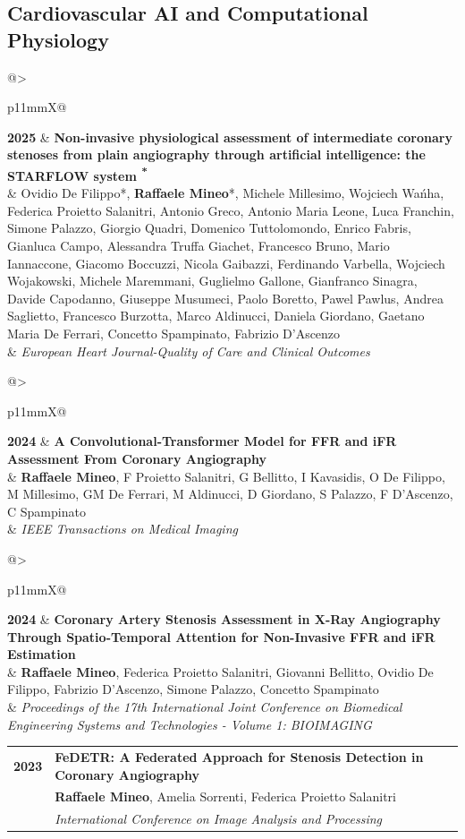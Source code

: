 \documentclass[10pt,a4paper]{article}
\makeatletter
\newcommand{\cvpub}[4]{%
\begin{tabularx}{\linewidth}{@{}>{\raggedright\arraybackslash}p{11mm}X@{}}
\textcolor{GoldAccent}{\textbf{#1}} &
\textbf{#2}\\[-1pt]
& \small #3\\[-1pt]
& \small\textit{#4}
\end{tabularx}\vspace{3.2pt}}
\makeatother
\begin{document}
\subsection{Cardiovascular AI and Computational Physiology}
\cvpub{2025}{Non-invasive physiological assessment of intermediate coronary stenoses from plain angiography through artificial intelligence: the STARFLOW system \textcolor{GoldAccent}{\textsuperscript{*}}}{Ovidio De Filippo*, \textbf{Raffaele Mineo}*, Michele Millesimo, Wojciech Wańha, Federica Proietto Salanitri, Antonio Greco, Antonio Maria Leone, Luca Franchin, Simone Palazzo, Giorgio Quadri, Domenico Tuttolomondo, Enrico Fabris, Gianluca Campo, Alessandra Truffa Giachet, Francesco Bruno, Mario Iannaccone, Giacomo Boccuzzi, Nicola Gaibazzi, Ferdinando Varbella, Wojciech Wojakowski, Michele Maremmani, Guglielmo Gallone, Gianfranco Sinagra, Davide Capodanno, Giuseppe Musumeci, Paolo Boretto, Pawel Pawlus, Andrea Saglietto, Francesco Burzotta, Marco Aldinucci, Daniela Giordano, Gaetano Maria De Ferrari, Concetto Spampinato, Fabrizio D'Ascenzo}{European Heart Journal-Quality of Care and Clinical Outcomes}
\cvpub{2024}{A Convolutional-Transformer Model for FFR and iFR Assessment From Coronary Angiography}{\textbf{Raffaele Mineo}, F Proietto Salanitri, G Bellitto, I Kavasidis, O De Filippo, M Millesimo, GM De Ferrari, M Aldinucci, D Giordano, S Palazzo, F D’Ascenzo, C Spampinato}{IEEE Transactions on Medical Imaging}
\cvpub{2024}{Coronary Artery Stenosis Assessment in X-Ray Angiography Through Spatio-Temporal Attention for Non-Invasive FFR and iFR Estimation}{\textbf{Raffaele Mineo}, Federica Proietto Salanitri, Giovanni Bellitto, Ovidio De Filippo, Fabrizio D'Ascenzo, Simone Palazzo, Concetto Spampinato}{Proceedings of the 17th International Joint Conference on Biomedical Engineering Systems and Technologies - Volume 1: BIOIMAGING}
\cvpub{2023}{FeDETR: A Federated Approach for Stenosis Detection in Coronary Angiography}{\textbf{Raffaele Mineo}, Amelia Sorrenti, Federica Proietto Salanitri}{International Conference on Image Analysis and Processing}
\end{document}
